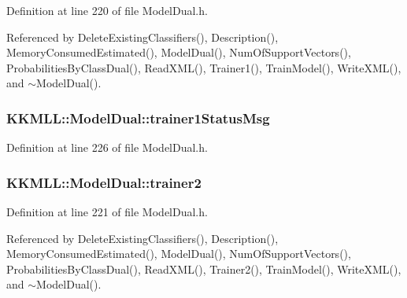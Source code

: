 Definition at line 220 of file Model\+Dual.\+h.



Referenced by Delete\+Existing\+Classifiers(), Description(), Memory\+Consumed\+Estimated(), Model\+Dual(), Num\+Of\+Support\+Vectors(), Probabilities\+By\+Class\+Dual(), Read\+X\+M\+L(), Trainer1(), Train\+Model(), Write\+X\+M\+L(), and $\sim$\+Model\+Dual().

\subsubsection[{\texorpdfstring{trainer1\+Status\+Msg}{trainer1StatusMsg}}]{ K\+K\+M\+L\+L\+::\+Model\+Dual\+::trainer1\+Status\+Msg\hspace{0.3cm}{\ttfamily [protected]}}\hypertarget{class_k_k_m_l_l_1_1_model_dual_a0dbaa3609d1b64535961a22863e206af}{}\label{class_k_k_m_l_l_1_1_model_dual_a0dbaa3609d1b64535961a22863e206af}


Definition at line 226 of file Model\+Dual.\+h.

\subsubsection[{\texorpdfstring{trainer2}{trainer2}}]{ K\+K\+M\+L\+L\+::\+Model\+Dual\+::trainer2\hspace{0.3cm}{\ttfamily [protected]}}\hypertarget{class_k_k_m_l_l_1_1_model_dual_aed7b1f99f54b08770555fb1e9c5d4b21}{}\label{class_k_k_m_l_l_1_1_model_dual_aed7b1f99f54b08770555fb1e9c5d4b21}


Definition at line 221 of file Model\+Dual.\+h.



Referenced by Delete\+Existing\+Classifiers(), Description(), Memory\+Consumed\+Estimated(), Model\+Dual(), Num\+Of\+Support\+Vectors(), Probabilities\+By\+Class\+Dual(), Read\+X\+M\+L(), Trainer2(), Train\+Model(), Write\+X\+M\+L(), and $\sim$\+Model\+Dual().

